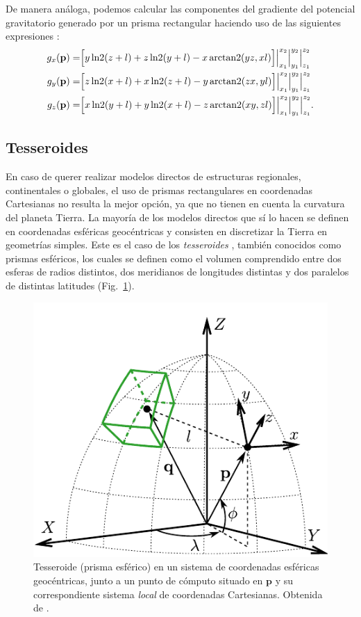 De manera análoga, podemos calcular las componentes del gradiente del potencial
gravitatorio generado por un prisma rectangular haciendo uso de las siguientes
expresiones \citep{nagy2000,nagy2002}:
%
\begin{align}
    g_x(\mathbf{p}) =&
        \Big[
            y \operatorname{ln2}(z + l) + z \operatorname{ln2}(y + l)  - x \operatorname{arctan2}(yz, xl)
        \Big]
        \Big|_{x_1}^{x_2}
        \Big|_{y_1}^{y_2}
        \Big|_{z_1}^{z_2} \\
    g_y(\mathbf{p}) =&
        \Big[
            z \operatorname{ln2}(x + l) + x \operatorname{ln2}(z + l)  - y \operatorname{arctan2}(zx, yl)
        \Big]
        \Big|_{x_1}^{x_2}
        \Big|_{y_1}^{y_2}
        \Big|_{z_1}^{z_2} \\
    g_z(\mathbf{p}) =&
        \Big[
            x \operatorname{ln2}(y + l) + y \operatorname{ln2}(x + l) - z \operatorname{arctan2}(xy, zl)
        \Big]
        \Big|_{x_1}^{x_2}
        \Big|_{y_1}^{y_2}
        \Big|_{z_1}^{z_2}.
\end{align}


\subsection{Tesseroides}

En caso de querer realizar modelos directos de estructuras regionales,
continentales o globales, el uso de prismas rectangulares en coordenadas
Cartesianas no resulta la mejor opción, ya que no tienen en cuenta la curvatura
del planeta Tierra.
La mayoría de los modelos directos que sí lo hacen se definen en coordenadas
esféricas geocéntricas y consisten en discretizar la Tierra en geometrías
simples.
Este es el caso de los \emph{tesseroides} \citep{anderson1976}, también
conocidos como prismas esféricos, los cuales se definen como el volumen
comprendido entre dos esferas de radios distintos, dos meridianos de longitudes
distintas y dos paralelos de distintas latitudes (Fig.~\ref{fig:tesseroid}).

\begin{figure}
    \centering
    \includegraphics[width=0.7\linewidth]{figs/tesseroid-coord-sys.pdf}
    \caption{
        Tesseroide (prisma esférico) en un sistema de coordenadas esféricas
        geocéntricas, junto a un punto de cómputo situado en $\mathbf{p}$ y su
        correspondiente sistema \emph{local} de coordenadas Cartesianas.
        Obtenida de \citet{uieda2015}.
    }
    \label{fig:tesseroid}
\end{figure}

